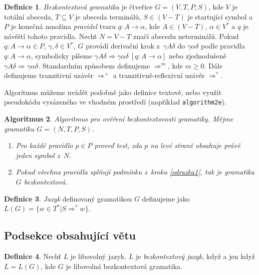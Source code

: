 \documentclass[a4paper,11pt,twocolumn]{article}
\theoremstyle{definition}
\newtheorem{definice}{Definice}[section]
\theoremstyle{definition}
\newtheorem{algoritmus}[definice]{Algoritmus}
\theoremstyle{definition}
\begin{document}
\begin{definice} \label{definice1.1} \emph{Bezkontextová gramatika} je čtveřice $G = (V, T, P, S)$, kde $V$ je totální abeceda, $T \subseteq V$ je abeceda terminálů, $S \in (V-T)$ je startující symbol a~$P$ je konečná množina \emph{pravidel}
tvaru $q\colon A\rightarrow \alpha$, kde $A \in (V-T)$, $\alpha \in V^*$ a $q$ je návěští tohoto pravidla. Nechť $N=V-T$ značí abecedu neterminálů.
Pokud $q\colon A\rightarrow \alpha \in P$, $\gamma, \delta \in V^*$, $G$ provádí derivační krok z~$\gamma A\delta$ do $\gamma \alpha \delta$ podle pravidla $q\colon A\rightarrow \alpha$, symbolicky píšeme $\gamma A\delta \Rightarrow \gamma \alpha \delta \ [q\colon A\rightarrow \alpha]$ nebo zjednodušeně $\gamma A\delta \Rightarrow \gamma \alpha \delta$. Standardním způsobem definujeme $\Rightarrow^m$, kde $m \geq 0$. Dále definujeme 
tranzitivní uzávěr $\Rightarrow^+$ a tranzitivně-reflexivní uzávěr $\Rightarrow^*$.\end{definice}

Algoritmus můžeme uvádět podobně jako definice textově, nebo využít pseudokódu vysázeného ve vhodném prostředí (například \texttt{algorithm2e}).

\begin{algoritmus} \emph{Algoritmus pro ověření bezkontextovosti gramatiky. Mějme gramatiku $G=(N,T,P,S)$.} \end{algoritmus}

\begin{enumerate}
\item[\itshape{1.}] \label{odrazka1} \emph{Pro každé pravidlo $p \in P$ proveď test, zda $p$ na levé straně obsahuje právě jeden symbol z~$N$.}
\item[\itshape{2.}] \emph{Pokud všechna pravidla splňují podmínku z~kroku \ref{odrazka1}, tak je gramatika $G$ bezkontextová.}
\end{enumerate}

\begin{definice} \emph{Jazyk} definovaný gramatikou $G$ definujeme jako $L(G)=\{w \in T^*|S \Rightarrow^* w\}$. \end{definice}

\addtocounter{secnumdepth}{1}
\subsection{Podsekce obsahující větu}

\begin{definice} Nechť $L$ je libovolný jazyk. $L$ je \emph{bezkontextový jazyk}, když a jen když $L=L(G)$, kde $G$ je libovolná bezkontextová gramatika. \end{definice}
\end{document}
